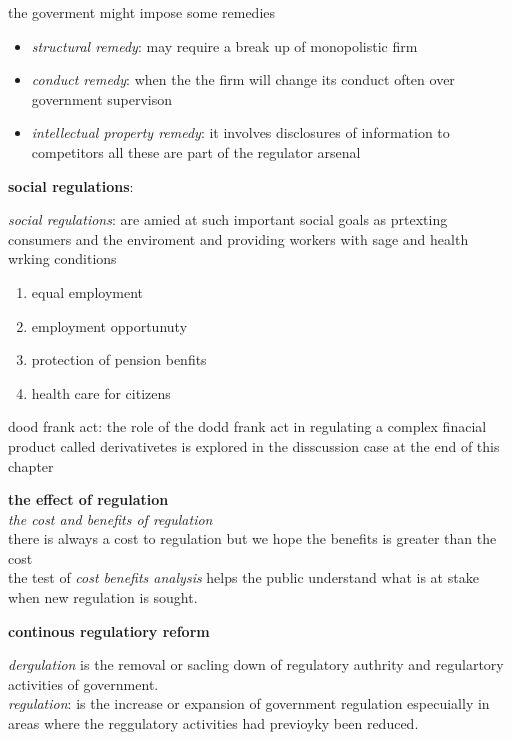 \documentclass{article}
\newcommand\tab[1][1cm]{\hspace*{#1}}
\begin{document}
 the goverment might impose some remedies 
 \begin{itemize}
 \item \textit{structural remedy}: may require a break up of monopolistic firm
 \item \textit{conduct remedy}: when the the firm will change its conduct 
 often over government supervison 
 \item \textit{intellectual property  remedy}: it involves disclosures  of information to competitors all these are part  of the regulator arsenal 
 \end{itemize}
     
   \tab[4cm]\textbf{social regulations}:
   
   \textit{social regulations}: are amied at such important social goals as prtexting consumers and the enviroment and providing workers with sage  and health wrking conditions
   \begin{enumerate}
   \item equal employment 
   \item employment opportunuty 
   \item protection of pension  benfits 
   \item health care for citizens 
\end{enumerate}    
   
   
   
 {\large dood frank act}: the role of the dodd frank act in regulating a complex finacial product called derivativetes is explored in the disscussion case at the end of this chapter 
 
 
 \tab[4cm]\textbf{the effect of regulation}\\
\textit{the cost and benefits of regulation}\\
there is always a cost to regulation but we hope the benefits is greater than the cost \\

the test of \textit{ cost benefits analysis}  helps the public understand what is at stake when new regulation is sought.

\tab[4cm]\textbf{continous regulatiory reform}

\textit{dergulation} is the removal or sacling down of regulatory  authrity  and regulartory  activities of government.\\ 
\textit{regulation}:  is the increase or expansion of government regulation especuially in areas where the reggulatory activities had previoyky been reduced.
\end{document}
